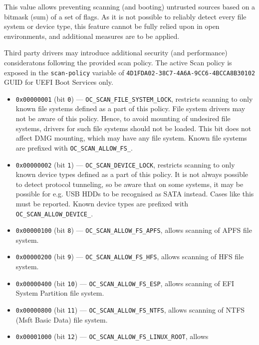 \documentclass[]{article}
\providecommand{\tightlist}{%
  \setlength{\itemsep}{0pt}\setlength{\parskip}{0pt}}
\begin{document}
\begin{enumerate}
  This value allows preventing scanning (and booting) untrusted
  sources based on a bitmask (sum) of a set of flags. As it is not possible
  to reliably detect every file system or device type, this feature
  cannot be fully relied upon in open environments, and additional
  measures are to be applied.

  Third party drivers may introduce additional security (and performance)
  consideratons following the provided scan policy. The active Scan policy is exposed
  in the \texttt{scan-policy} variable of \texttt{4D1FDA02-38C7-4A6A-9CC6-4BCCA8B30102}
  GUID for UEFI Boot Services only.

  \begin{itemize}
  \tightlist
    \item \texttt{0x00000001} (bit \texttt{0}) --- \texttt{OC\_SCAN\_FILE\_SYSTEM\_LOCK}, restricts
    scanning to only known file systems defined as a part of this policy. File system
    drivers may not be aware of this policy. Hence, to avoid mounting of undesired file
    systems, drivers for such file systems should not be loaded. This bit does not affect DMG mounting,
    which may have any file system. Known file systems are prefixed with
    \texttt{OC\_SCAN\_ALLOW\_FS\_}.
    \item \texttt{0x00000002} (bit \texttt{1}) --- \texttt{OC\_SCAN\_DEVICE\_LOCK}, restricts scanning
    to only known device types defined as a part of this policy. It is not always possible
    to detect protocol tunneling, so be aware that on some systems, it may be possible for
    e.g. USB HDDs to be recognised as SATA instead. Cases like this must be reported. Known device
    types are prefixed with \texttt{OC\_SCAN\_ALLOW\_DEVICE\_}.
    \item \texttt{0x00000100} (bit \texttt{8}) --- \texttt{OC\_SCAN\_ALLOW\_FS\_APFS}, allows scanning
    of APFS file system.
    \item \texttt{0x00000200} (bit \texttt{9}) --- \texttt{OC\_SCAN\_ALLOW\_FS\_HFS}, allows scanning
    of HFS file system.
    \item \texttt{0x00000400} (bit \texttt{10}) --- \texttt{OC\_SCAN\_ALLOW\_FS\_ESP}, allows scanning
    of EFI System Partition file system.
    \item \texttt{0x00000800} (bit \texttt{11}) --- \texttt{OC\_SCAN\_ALLOW\_FS\_NTFS}, allows scanning
    of NTFS (Msft Basic Data) file system.
    \item \texttt{0x00001000} (bit \texttt{12}) --- \texttt{OC\_SCAN\_ALLOW\_FS\_LINUX\_ROOT}, allows

\end{itemize}
\end{enumerate}
\end{document}
